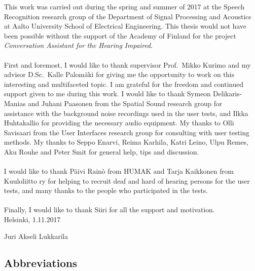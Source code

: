 \documentclass[english, 12pt, a4paper, pdftex, elec, utf8]{aaltothesis}
\begin{document}
This work was carried out during the spring and summer of 2017 at the Speech Recognition research group of the Department of Signal Processing and Acoustics at Aalto University School of Electrical Engineering. This thesis would not have been possible without the support of the Academy of Finland for the project \textit{Conversation Assistant for the Hearing Impaired}. \\\\
First and foremost, I would like to thank supervisor Prof.\ Mikko Kurimo and my advisor D.Sc.\ Kalle Palomäki for giving me the opportunity to work on this interesting and multifaceted topic. I am grateful for the freedom and continued support given to me during this work. I would like to thank Symeon Delikaris-Manias and Juhani Paasonen from the Spatial Sound research group for assistance with the background noise recordings used in the user tests, and Ilkka Huhtakallio for providing the necessary audio equipment. My thanks to Olli Savisaari from the User Interfaces research group for consulting with user testing methods. My thanks to Seppo Enarvi, Reima Karhila, Katri Leino, Ulpu Remes, Aku Rouhe and Peter Smit for general help, tips and discussion. \\\\
I would like to thank Päivi Rainò from HUMAK and Tarja Kaikkonen from Kuuloliitto ry for helping to recruit deaf and hard of hearing persons for the user tests, and many thanks to the people who participated in the tests. \\\\
Finally, I would like to thank Siiri for all the support and motivation. \\

\vspace{1cm}
\noindent Helsinki, 1.11.2017

\vspace{5mm}
\noindent Juri Akseli Lukkarila

\newpage

\thesistableofcontents


\subsection*{Abbreviations}
\end{document}
